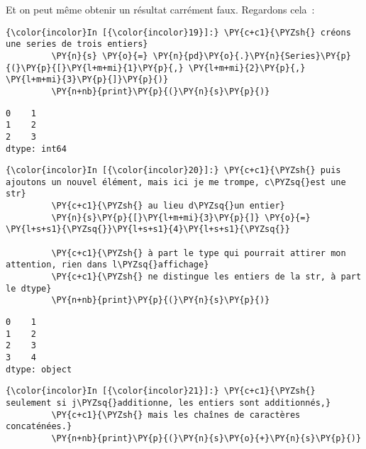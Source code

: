 Et on peut même obtenir un résultat carrément faux. Regardons cela~:

    \begin{Verbatim}[commandchars=\\\{\},frame=single,framerule=0.3mm,rulecolor=\color{cellframecolor}]
{\color{incolor}In [{\color{incolor}19}]:} \PY{c+c1}{\PYZsh{} créons une series de trois entiers}
         \PY{n}{s} \PY{o}{=} \PY{n}{pd}\PY{o}{.}\PY{n}{Series}\PY{p}{(}\PY{p}{[}\PY{l+m+mi}{1}\PY{p}{,} \PY{l+m+mi}{2}\PY{p}{,} \PY{l+m+mi}{3}\PY{p}{]}\PY{p}{)}
         \PY{n+nb}{print}\PY{p}{(}\PY{n}{s}\PY{p}{)}
\end{Verbatim}


    \begin{Verbatim}[commandchars=\\\{\},frame=single,framerule=0.3mm,rulecolor=\color{cellframecolor}]
0    1
1    2
2    3
dtype: int64
\end{Verbatim}

    \begin{Verbatim}[commandchars=\\\{\},frame=single,framerule=0.3mm,rulecolor=\color{cellframecolor}]
{\color{incolor}In [{\color{incolor}20}]:} \PY{c+c1}{\PYZsh{} puis ajoutons un nouvel élément, mais ici je me trompe, c\PYZsq{}est une str}
         \PY{c+c1}{\PYZsh{} au lieu d\PYZsq{}un entier}
         \PY{n}{s}\PY{p}{[}\PY{l+m+mi}{3}\PY{p}{]} \PY{o}{=} \PY{l+s+s1}{\PYZsq{}}\PY{l+s+s1}{4}\PY{l+s+s1}{\PYZsq{}}
         
         \PY{c+c1}{\PYZsh{} à part le type qui pourrait attirer mon attention, rien dans l\PYZsq{}affichage}
         \PY{c+c1}{\PYZsh{} ne distingue les entiers de la str, à part le dtype}
         \PY{n+nb}{print}\PY{p}{(}\PY{n}{s}\PY{p}{)}
\end{Verbatim}


    \begin{Verbatim}[commandchars=\\\{\},frame=single,framerule=0.3mm,rulecolor=\color{cellframecolor}]
0    1
1    2
2    3
3    4
dtype: object
\end{Verbatim}

    \begin{Verbatim}[commandchars=\\\{\},frame=single,framerule=0.3mm,rulecolor=\color{cellframecolor}]
{\color{incolor}In [{\color{incolor}21}]:} \PY{c+c1}{\PYZsh{} seulement si j\PYZsq{}additionne, les entiers sont additionnés,}
         \PY{c+c1}{\PYZsh{} mais les chaînes de caractères concaténées.}
         \PY{n+nb}{print}\PY{p}{(}\PY{n}{s}\PY{o}{+}\PY{n}{s}\PY{p}{)}
\end{Verbatim}



